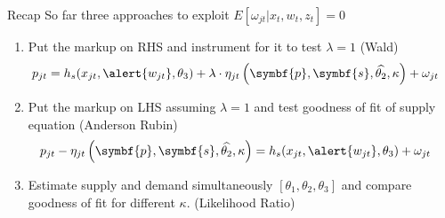 \documentclass[aspectratio=169,10pt]{beamer}
\begin{document}
\begin{frame}{Recap}
\small
So far three approaches to exploit $ E[\omega_{jt} | x_{t},w_{t},z_{t}]=0$
\begin{enumerate}
\item Put the markup on RHS and instrument for it to test $\lambda=1$ (Wald)
\begin{align*}
 p_{jt} &= h_s(x_{jt}, \alert{w_{jt}},\theta_3) + \lambda \cdot \eta_{jt}\left(\symbf{p},\symbf{s},\widehat{\theta_2},\kappa \right)+  \omega_{jt}
\end{align*}
\item Put the markup on LHS assuming $\lambda=1$ and test goodness of fit of supply equation (Anderson Rubin)
\begin{align*}
 p_{jt} -\eta_{jt}\left(\symbf{p},\symbf{s},\widehat{\theta_2},\kappa \right)&= h_s(x_{jt}, \alert{w_{jt}},\theta_3) +  \omega_{jt}
\end{align*}
\item Estimate supply and demand simultaneously $[\theta_1,\theta_2,\theta_3]$ and compare goodness of fit for different $\kappa$. (Likelihood Ratio)
\end{enumerate}

\end{frame}

\end{document}
